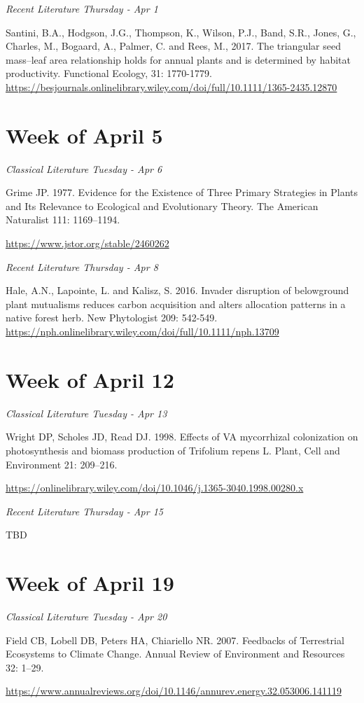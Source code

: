 \documentclass[12pt, notitlepage]{article}   	%
\begin{document}
{\textit{Recent Literature Thursday - Apr 1} \par
Santini, B.A., Hodgson, J.G., Thompson, K., Wilson, P.J., Band, S.R., Jones, G., 
Charles, M., Bogaard, A., Palmer, C. and Rees, M., 2017. 
The triangular seed mass–leaf area relationship holds for annual plants and is determined by habitat productivity. 
Functional Ecology, 31: 1770-1779.
\url{https://besjournals.onlinelibrary.wiley.com/doi/full/10.1111/1365-2435.12870}

\section*{Week of April 5}
\textit{Classical Literature Tuesday - Apr 6} \par
Grime JP. 1977. Evidence for the Existence of Three Primary Strategies in Plants and Its 
Relevance to Ecological and Evolutionary Theory. 
The American Naturalist 111: 1169–1194. \par
\url{https://www.jstor.org/stable/2460262}

\textit{Recent Literature Thursday - Apr 8} \par
Hale, A.N., Lapointe, L. and Kalisz, S. 2016. 
Invader disruption of belowground plant mutualisms reduces carbon acquisition and 
alters allocation patterns in a native forest herb. New Phytologist 209: 542-549.
\url{https://nph.onlinelibrary.wiley.com/doi/full/10.1111/nph.13709}

\section*{Week of April 12}
\textit{Classical Literature Tuesday - Apr 13} \par
Wright DP, Scholes JD, Read DJ. 1998. Effects of VA mycorrhizal colonization on 
photosynthesis and biomass production of Trifolium repens L. 
Plant, Cell and Environment 21: 209–216. \par
\url{https://onlinelibrary.wiley.com/doi/10.1046/j.1365-3040.1998.00280.x}

\textit{Recent Literature Thursday - Apr 15} \par
TBD

\section*{Week of April 19}
\textit{Classical Literature Tuesday - Apr 20} \par
Field CB, Lobell DB, Peters HA, Chiariello NR. 2007. Feedbacks of Terrestrial Ecosystems 
to Climate Change. Annual Review of Environment and Resources 32: 1–29. \par
\url{https://www.annualreviews.org/doi/10.1146/annurev.energy.32.053006.141119}

}
\end{document}
